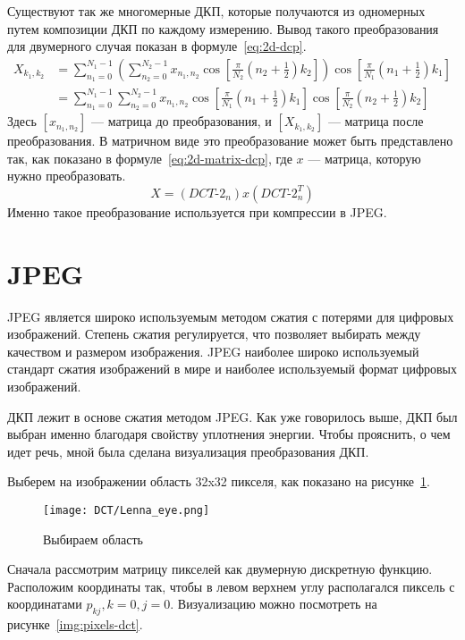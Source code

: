 Существуют так же многомерные ДКП, которые получаются из одномерных путем композиции ДКП по каждому измерению.
Вывод такого преобразования для двумерного случая показан в формуле~\ref{eq:2d-dcp}.
\begin{align}
    X_{k_1,k_2} &= \nonumber
    \sum_{n_1=0}^{N_1-1}
    \left( \sum_{n_2=0}^{N_2-1}
    x_{n_1,n_2} 
    \cos \left[\frac{\pi}{N_2} \left(n_2+\frac{1}{2}\right) k_2 \right]\right)
    \cos \left[\frac{\pi}{N_1} \left(n_1+\frac{1}{2}\right) k_1 \right]\\
    &= \sum_{n_1=0}^{N_1-1}
    \sum_{n_2=0}^{N_2-1}
    x_{n_1,n_2} 
    \cos \left[\frac{\pi}{N_1} \left(n_1+\frac{1}{2}\right) k_1 \right]
    \cos \left[\frac{\pi}{N_2} \left(n_2+\frac{1}{2}\right) k_2 \right] \label{eq:2d-dcp}
\end{align}
Здесь $[x_{n_1,n_2}]$ --- матрица до преобразования, и $[X_{k_1,k_2}]$ --- матрица
после преобразования.
В матричном виде это преобразование может быть представлено так, как показано
в формуле~\ref{eq:2d-matrix-dcp}, где $x$ --- матрица, которую нужно преобразовать.
\begin{equation} \label{eq:2d-matrix-dcp}
    X = ({DCT}\text{-}2_n) x ({DCT}\text{-}2_n ^ T)
\end{equation}
Именно такое преобразование используется при компрессии в JPEG.

\section{JPEG}
JPEG является широко используемым методом сжатия с потерями для цифровых изображений.
Степень сжатия регулируется, что позволяет выбирать между качеством и размером изображения.
JPEG наиболее широко используемый стандарт сжатия изображений в мире и
наиболее используемый формат цифровых изображений.

ДКП лежит в основе сжатия методом JPEG. Как уже говорилось выше,
ДКП был выбран именно благодаря свойству уплотнения энергии. Чтобы прояснить,
о чем идет речь, мной была сделана визуализация преобразования ДКП.

Выберем на изображении область 32x32 пикселя, как показано на рисунке~\ref{img:lenna-eye}.

\begin{figure}[ht!]
    \centering
    \texttt{[image: DCT/Lenna\_eye.png]}
    \caption{Выбираем область}
    \label{img:lenna-eye}
\end{figure}

Сначала рассмотрим матрицу пикселей как двумерную дискретную функцию.
Расположим координаты так, чтобы в левом верхнем углу
располагался пиксель с координатами $p_{kj}, k = 0, j = 0$.
Визуализацию можно посмотреть на рисунке~\ref{img:pixels-dct}.

